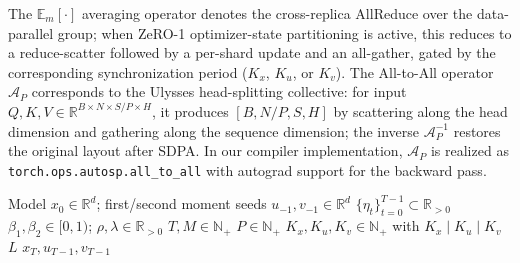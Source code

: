 \documentclass{article}
\begin{document}
The $\mathbb{E}_m[\cdot]$ averaging operator denotes the cross-replica AllReduce over the
data-parallel group; when ZeRO-1 optimizer-state partitioning is active, this reduces to a
reduce-scatter followed by a per-shard update and an all-gather, gated by the corresponding
synchronization period ($K_x$, $K_u$, or $K_v$).
The All-to-All operator $\mathcal{A}_P$ corresponds to the Ulysses head-splitting
collective: for input $Q,K,V \in \mathbb{R}^{B \times N \times S/P \times H}$,
it produces $[B, N/P, S, H]$ by scattering along the head dimension and gathering
along the sequence dimension; the inverse $\mathcal{A}_P^{-1}$ restores the original
layout after SDPA. In our compiler implementation,
$\mathcal{A}_P$ is realized as \texttt{torch.ops.autosp.all\_to\_all} with
autograd support for the backward pass.

\begin{algorithm}[ht]
\caption{FAUST-Adam with Explicit SP--DP Collective Orchestration}
\label{alg:desloc_adam}
\begin{algorithmic}[1]
\REQUIRE Model $x_0 \in \mathbb{R}^d$; first/second moment seeds $u_{-1}, v_{-1} \in \mathbb{R}^d$
\REQUIRE $\{\eta_t\}_{t=0}^{T-1} \subset \mathbb{R}_{>0}$ 
\REQUIRE $\beta_1, \beta_2 \in [0,1)$; $\rho, \lambda \in \mathbb{R}_{>0}$ 
\REQUIRE $T, M \in \mathbb{N}_+$ 
\REQUIRE $P \in \mathbb{N}_+$ 
\REQUIRE $K_x, K_u, K_v \in \mathbb{N}_+$ with $K_x \mid K_u \mid K_v$ 
\REQUIRE $L$ 
\ENSURE $x_T, u_{T-1}, v_{T-1}$


\end{algorithmic}
\end{algorithm}
\end{document}
